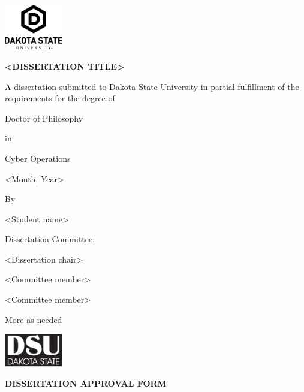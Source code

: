 \documentclass[12pt,openany]{book}
\begin{document}
\frontmatter

\thispagestyle{empty}

\begin{center}
\includegraphics[width=1in]{DSU_UniversityLogo_Stacked_BLK}

\bigskip
{\Large\bfseries {\textless}\textbf{DISSERTATION TITLE}{\textgreater}}

\vspace*{.8in}

A dissertation submitted to Dakota State University in partial fulfillment of the requirements for the degree of

\vspace*{20pt}

Doctor of Philosophy

\vspace*{20pt}

in

\vspace*{20pt}

Cyber Operations

\vspace*{20pt}

{\textless}Month, Year{\textgreater}

\vspace*{20pt}

By

{\textless}Student name{\textgreater}

\vspace*{.5in}

Dissertation Committee:

\vspace*{13pt}

{\textless}Dissertation chair{\textgreater}

{\textless}Committee member{\textgreater}

{\textless}Committee member{\textgreater}

More as needed

\end{center}

\clearpage

\begin{center}
\includegraphics[width=1in]{DSU}

\bigskip
{\Large\bfseries DISSERTATION APPROVAL FORM}\\
\end{center}
\end{document}
